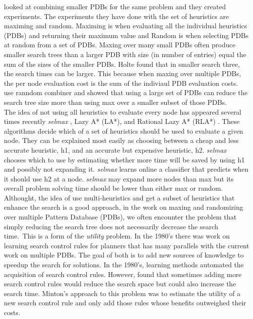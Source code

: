 \documentclass[a4paper,12pt]{article}
\begin{document}
\citep{holte2004multiple} looked at combining smaller PDBs for the same problem and they created experiments. The experiments they have done with the set of heuristics are maximing and random. Maximing is when evaluating all the individual heuristics (PDBs) and returning their maximum value and Random is when selecting PDBs at random from a set of PDBs. Maxing over many small PDBs often produce smaller search trees than a larger PDB with size (in number of entries) equal the sum of the sizes of the smaller PDBs. Holte found that in smaller search three, the search times can be larger. This because when maxing over multiple PDBs, the  per node evaluation cost is the sum of the indiviaul PDB evaluation costs. \citep{zahavi2007inconsistent} use ranndom combiner and showed that using a large set of PDBs can reduce the search tree size more than using max over a smaller subset of those PDBs.\\

The idea of not using all heuristics to evaluate every node has appeared several times recently \textit{selmax} \citet{domshlak2011selmax}, Lazy A* (LA*), and Rational Lazy A* (RLA*) \citep{tolpin2013towards}. These algorithms decide which of a set of heuristics should be used to evaluate a given node. They can be explained most easily as choosing between a cheap and less accurate heuristic, h1, and an accurate but expensive heuristic, h2. \textit{selmax} chooses which to use by estimating whether more time will be saved by using h1 and possibly not expanding it. \textit{selmax} learns online a classifier that predicts when it should use h2 at a node. \textit{selmax} may expand more nodes than max but its overall problem solving time should be lower than either max or random.\\

Althought, the idea of use multi-heuristics and get a subset of heuristics that enhance the search is a good approach, in the work on maxing and randomizing over multiple Pattern Database (PDBs), we often encounter the problem that simply reducing the search tree does not necessarily decrease the search time.\
This is a form of the \textit{utility} problem. In the 1980's there was work on learning search control rules for planners that has many parallels with the current work on multiple PDBs. The goal of both is to add new sources of knowledge to speedup the search for solutions. In the 1980's, learning methods automated the acquisition of search control rules. However, \citep{Minton1990363} found that sometimes adding more search control rules would reduce the search space but could also increase the search time. Minton's approach to this problem was to estimate the utility of a new search control rule and only add those rules whose benefits outweighed their costs.\\
\end{document}
